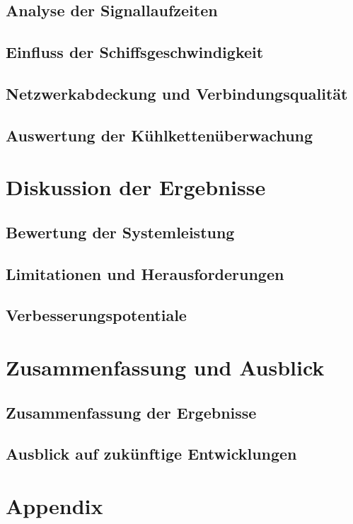 \documentclass[
	a4paper,
	12pt,
	bibtotoc,
	listof=totoc,
	titlepage
]{scrartcl}
\begin{document}
\subsection{Analyse der Signallaufzeiten}
\subsection{Einfluss der Schiffsgeschwindigkeit}
\subsection{Netzwerkabdeckung und Verbindungsqualität}
\subsection{Auswertung der Kühlkettenüberwachung}

\section{Diskussion der Ergebnisse}
\subsection{Bewertung der Systemleistung}
\subsection{Limitationen und Herausforderungen}
\subsection{Verbesserungspotentiale}

\section{Zusammenfassung und Ausblick}
\subsection{Zusammenfassung der Ergebnisse}
\subsection{Ausblick auf zukünftige Entwicklungen}

\newpage
\appendix
\section{Appendix}

\pagebreak
\clearpage
\printbibliography

\clearpage
\listoffigures

\clearpage
\listoftables

\clearpage
\lstlistoflistings

\clearpage

\end{document}
